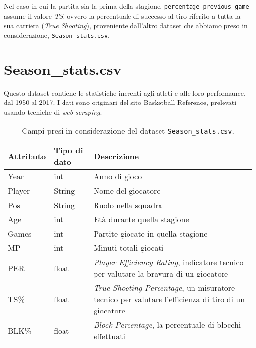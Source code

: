 \begin{code}
\inputminted[breaklines]{python}{../datasets/shot_logs_nv.py}
\end{code}

Nel caso in cui la partita sia la prima della stagione, \texttt{percentage\_previous\_game} assume il valore \textit{TS}, ovvero la percentuale di successo al tiro riferito a tutta la sua carriera (\textit{True Shooting}), proveniente dall’altro dataset che abbiamo preso in considerazione, \texttt{Season\_stats.csv}.

\section{Season\_stats.csv}

Questo dataset contiene le statistiche inerenti agli atleti e alle loro performance, dal 1950 al 2017. I dati sono originari del sito Basketball Reference, prelevati usando tecniche di \textit{web scraping}.

\begin{center}
	\begin{longtable}[m]{|m{5em} m{7em} m{16em}|} 

		\caption{Campi presi in considerazione del dataset \texttt{Season\_stats.csv}.\label{long}}\\
		\hline
		\bfseries{Attributo} & \bfseries{Tipo di dato} & \bfseries{Descrizione} \\
		\hline

		Year & int & Anno di gioco\\ 
		\hline
		Player & String & Nome del giocatore\\ 
		\hline
		Pos & String & Ruolo nella squadra\\ 
		\hline
		Age & int & Età durante quella stagione\\ 
		\hline
		Games & int & Partite giocate in quella stagione\\ 
		\hline
		MP & int & Minuti totali giocati\\ 
		\hline
		PER & float & \textit{Player Efficiency Rating}, indicatore tecnico per valutare la bravura di un giocatore \\ 
		\hline
		TS\% & float & \textit{True Shooting Percentage}, un misuratore tecnico per valutare l’efficienza di tiro di un giocatore  \\ 
		\hline
		BLK\% & float & \textit{Block Percentage}, la percentuale di blocchi effettuati \\ 
		\hline

	\end{longtable}
\end{center}

